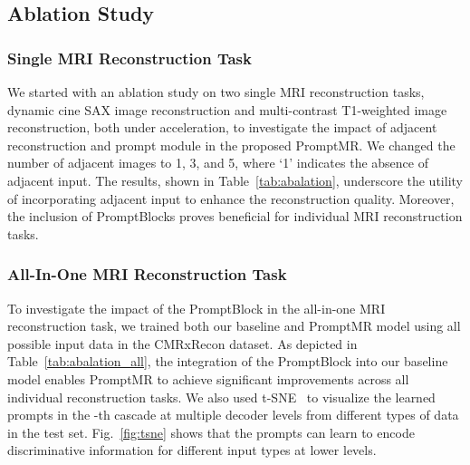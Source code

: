 \documentclass[runningheads]{llncs}
\begin{document}
\subsection{Ablation Study}

\subsubsection{Single MRI Reconstruction Task}
We started with an ablation study on two single MRI reconstruction tasks, dynamic cine SAX image reconstruction and multi-contrast T1-weighted image reconstruction, both under  acceleration, to investigate the impact of adjacent reconstruction and prompt module in the proposed PromptMR. 
We changed the number of adjacent images to 1, 3, and 5, where `1' indicates the absence of adjacent input. The results, shown in Table~\ref{tab:abalation}, underscore the utility of incorporating adjacent input to enhance the reconstruction quality. Moreover, the inclusion of PromptBlocks proves beneficial for individual MRI reconstruction tasks.

\begin{table}[t!]
    \centering
    \label{tab:abalation}
\end{table}

\subsubsection{All-In-One MRI Reconstruction Task}
To investigate the impact of the PromptBlock in the all-in-one MRI reconstruction task, we trained both our baseline and PromptMR model using all possible input data in the CMRxRecon dataset. As depicted in Table~\ref{tab:abalation_all}, the integration of the PromptBlock into our baseline model enables PromptMR to achieve significant improvements across all individual reconstruction tasks. We also used t-SNE~\cite{van2008visualizing} to visualize the learned prompts in the -th cascade at multiple decoder levels from different types of data in the test set. Fig.~\ref{fig:tsne} shows that the prompts can learn to encode discriminative information for different input types at lower levels.
\end{document}
